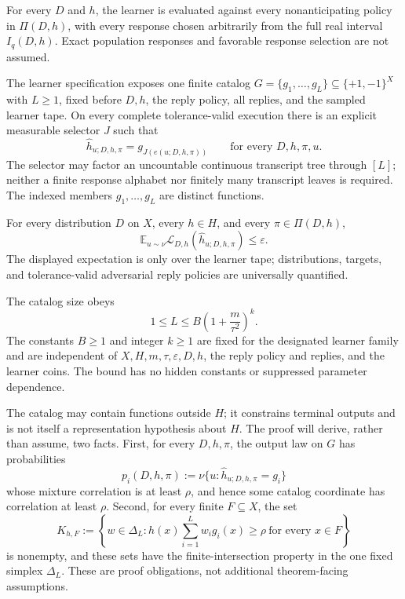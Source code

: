 \begin{assumption}
\label{assump:full-adversarial-tolerance}
For every $D$ and $h$, the learner is evaluated against every
nonanticipating policy in $\Pi(D,h)$, with every response chosen arbitrarily
from the full real interval $I_q(D,h)$.  Exact population responses and
favorable response selection are not assumed.
\end{assumption}

\begin{assumption}
\label{assump:finite-terminal-catalog}
The learner specification exposes one finite catalog
$G=\{g_1,\ldots,g_L\}\subseteq\{+1,-1\}^{X}$ with $L\ge1$, fixed before
$D,h$, the reply policy, all replies, and the sampled learner tape.  On every
complete tolerance-valid execution there is an explicit measurable selector
$J$ such that
\[
\widehat h_{u;D,h,\pi}=g_{J(e(u;D,h,\pi))}
\qquad\text{for every }D,h,\pi,u.
\]
The selector may factor an uncountable continuous transcript tree through
$[L]$; neither a finite response alphabet nor finitely many transcript leaves
is required.  The indexed members $g_1,\ldots,g_L$ are distinct functions.
\end{assumption}

\begin{assumption}
\label{assump:universal-expected-accuracy}
For every distribution $D$ on $X$, every $h\in H$, and every
$\pi\in\Pi(D,h)$,
\[
\mathbb E_{u\sim\nu}
\mathcal L_{D,h}(\widehat h_{u;D,h,\pi})\le\varepsilon.
\]
The displayed expectation is only over the learner tape; distributions,
targets, and tolerance-valid adversarial reply policies are universally
quantified.
\end{assumption}

\begin{assumption}
\label{assump:polynomial-catalog-budget}
The catalog size obeys
\[
1\le L\le B\left(1+\frac{m}{\tau^2}\right)^k.
\]
The constants $B\ge1$ and integer $k\ge1$ are fixed for the designated
learner family and are independent of
$X,H,m,\tau,\varepsilon,D,h$, the reply policy and replies, and the learner
coins.  The bound has no hidden constants or suppressed parameter dependence.
\end{assumption}

The catalog may contain functions outside $H$; it constrains terminal outputs
and is not itself a representation hypothesis about $H$.  The proof will
derive, rather than assume, two facts.  First, for every $D,h,\pi$, the output
law on $G$ has probabilities
\[
p_i(D,h,\pi):=\nu\{u:\widehat h_{u;D,h,\pi}=g_i\}
\]
whose mixture correlation is at least $\rho$, and hence some catalog
coordinate has correlation at least $\rho$.  Second, for every finite
$F\subseteq X$, the set
\[
K_{h,F}:=\left\{w\in\Delta_L:
h(x)\sum_{i=1}^Lw_i g_i(x)\ge\rho\ \text{for every }x\in F\right\}
\]
is nonempty, and these sets have the finite-intersection property in the one
fixed simplex $\Delta_L$.  These are proof obligations, not additional
theorem-facing assumptions.

